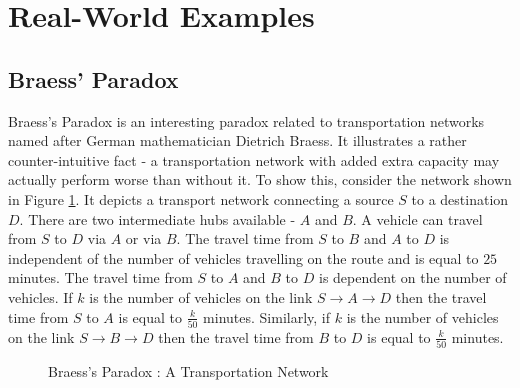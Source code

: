 \documentclass{article}
\theoremstyle{definition}
\begin{document}


\section{Real-World Examples}

\subsection{Braess' Paradox}

Braess's Paradox is an interesting paradox related to transportation networks named after German mathematician Dietrich Braess. It illustrates a rather counter-intuitive fact - a transportation network with added extra capacity may actually perform worse than without it. To show this, consider the network shown in Figure \ref{fig:braess1}. It depicts a transport network connecting a source $S$ to a destination $D$. There are two intermediate hubs available - $A$ and $B$. A vehicle can travel from $S$ to $D$ via $A$ or via $B$. The travel time from $S$ to $B$ and $A$ to $D$ is independent of the number of vehicles travelling on the route and is equal to $25$ minutes. The travel time from $S$ to $A$ and $B$ to $D$ is dependent on the number of vehicles. If $k$ is the number of vehicles on the link $S \rightarrow A \rightarrow D$ then the travel time from $S$ to $A$ is equal to $\frac{k}{50}$ minutes. Similarly, if $k$ is the number of vehicles on the link $S \rightarrow B \rightarrow D$ then the travel time from $B$ to $D$ is equal to $\frac{k}{50}$ minutes.

\begin{figure}[!h]
  \centering
{}  \caption{Braess's Paradox : A Transportation Network }
  \label{fig:braess1}
\end{figure}
\end{document}
